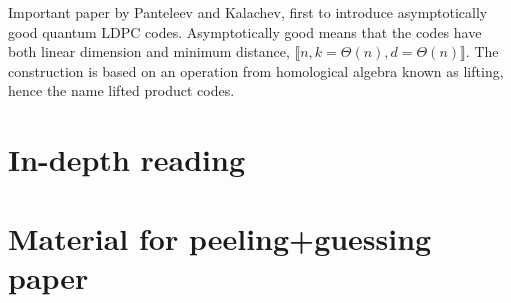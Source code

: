 \documentclass{article}
\begin{document}
Important paper by Panteleev and Kalachev, first to introduce asymptotically good quantum LDPC codes. Asymptotically good means that the codes have both linear dimension and minimum distance, $\llbracket n, k=\Theta(n), d=\Theta(n)\rrbracket$. The construction is based on an operation from homological algebra known as lifting, hence the name lifted product codes. 

\subsection{}

\section{In-depth reading}

% 

% 

% 


\newpage

\section{Material for peeling+guessing paper}



\newpage
\printbibliography
\end{document}
